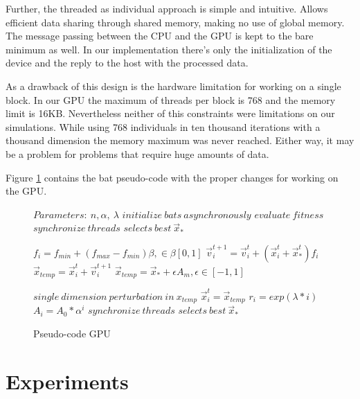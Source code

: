 \documentclass[conference]{IEEEtran}
\begin{document}
Further, the threaded as individual approach is simple and intuitive.
Allows efficient data sharing through shared memory, making no use of global memory.
The message passing between the CPU and the GPU is kept to the bare minimum as well.
In our implementation there's only the initialization of the device and
the reply to the host with the processed data.


As a drawback of this design is the hardware limitation for working
on a single block. In our GPU the maximum of threads per block is 768
and the memory limit is 16KB. Nevertheless neither of this constraints
were limitations on our simulations. While using 768 individuals in ten
thousand iterations with a thousand dimension the memory maximum was
never reached. Either way, it may be a problem for problems that require
huge amounts of data.

Figure \ref{gpu-pseudo} contains the bat pseudo-code with the proper changes for 
working on the GPU.

\begin{figure}[H]
\begin{algorithmic}[1]
\State $Parameters:\ n,\alpha,\ \lambda$
\State $initialize\ bats\ asynchronously$
\State $evaluate\ fitness$
\State $synchronize\ threads$
\State $selects\ best\ \vec{x}_*$

        \State $f_i=f_{min} + (f_{max} - f_{min})\beta, \in \beta [0,1]$
        \State $\vec{v}_i^{t+1} = \vec{v}_i^{t} + (\vec{x}_i^{t} + \vec{x}_*^{t})f_i$
        \State $\vec{x}_{temp} = \vec{x}_i^{t} + \vec{v}_i^{t+1}$
            \State $\vec{x}_{temp} = \vec{x}_* + \epsilon A_m, \epsilon \in [-1, 1]$
        \EndIf

        \State $single\ dimension\ perturbation\ in\ x_{temp}$
            \State $\vec{x}_i^t = \vec{x}_{temp}$
            \State $r_i = exp(\lambda * i)$
            \State $A_i =  A_{0} * \alpha^i$
        \EndIf
    \EndFor
    \State $synchronize\ threads$
    \State $selects\ best\ \vec{x}_*$
\EndWhile
\end{algorithmic}
\caption{Pseudo-code GPU}
\label{gpu-pseudo}
\end{figure}


\section{Experiments} \label{experiments}%
\end{document}
